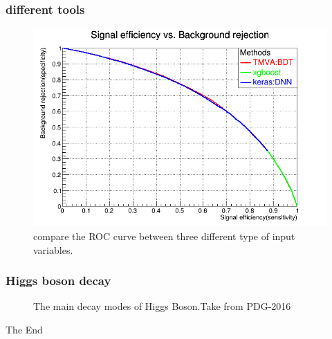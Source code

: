 \documentclass{beamer}
\begin{document}
\begin{frame}
\frametitle{different tools}
\begin{figure}
\includegraphics[scale=0.25]{./figures/tmva_xgboost.png}
\caption{compare the ROC curve between three different type of input variables.}
\end{figure}
\end{frame}

\begin{frame}
\frametitle{Higgs boson decay}
\begin{figure}[H]
\centering
{} 
\caption{The main decay modes of Higgs Boson.Take from 	PDG-2016}
\end{figure}
\end{frame}







\begin{frame}
\Huge{\centerline{The End}}
\end{frame}

\end{document}
